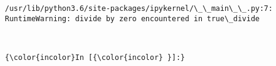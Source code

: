 \documentclass[11pt]{article}
\begin{document}
    \begin{Verbatim}[commandchars=\\\{\}]
/usr/lib/python3.6/site-packages/ipykernel/\_\_main\_\_.py:7: RuntimeWarning: divide by zero encountered in true\_divide

    \end{Verbatim}

    \begin{center}
    \end{center}
    { \hspace*{\fill} \\}
    
    \begin{Verbatim}[commandchars=\\\{\}]
{\color{incolor}In [{\color{incolor} }]:} 
\end{Verbatim}



    
    
    
    
\end{document}
